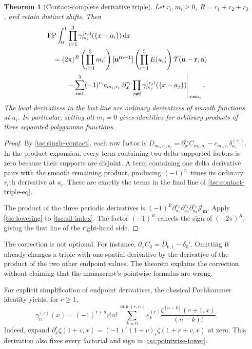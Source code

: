 \documentclass[11pt]{article}
\numberwithin{equation}{section}
\newtheorem{theorem}{Theorem}[section]
\theoremstyle{definition}\newtheorem{definition}[theorem]{Definition}
\theoremstyle{remark}\newtheorem{remark}[theorem]{Remark}
\DeclareMathOperator{\FP}{FP}
\newcommand{\dd}{\,\mathrm d}
\newcommand{\calJ}{\mathcal J}
\newcommand{\calT}{\mathcal T}
\begin{document}
\begin{theorem}[Contact-complete derivative triple]\label{tsc:contact-triple}
Let $r_i,m_i\ge0$, $R=r_1+r_2+r_3$, and retain distinct shifts. Then
\begin{align}\label{tsc:contact-triple-eq}
 &\FP\int_0^1\prod_{i=1}^3
            \gamma_{m_i}^{(r_i)}(\{x-a_i\})\dd x\notag\\
 &\quad=(2\pi)^R\left(\prod_{i=1}^3m_i!\right)
    [\mathbf u^{\mathbf m+\mathbf1}]
        \left(\prod_{i=1}^3E(u_i)\right)
                       \calT(\mathbf u-\mathbf r;\mathbf a)\notag\\
 &\qquad\quad-
    \sum_{i=1}^3(-1)^{r_i}c_{m_i,r_i}
       \left.\partial_x^{r_i}
              \prod_{j\ne i}\gamma_{m_j}^{(r_j)}(\{x-a_j\})
       \right|_{x=a_i}.
\end{align}
The local derivatives in the last line are ordinary derivatives of smooth
functions at $a_i$. In particular, setting all $m_i=0$ gives identities for
arbitrary products of three separated polygamma functions.
\end{theorem}
\begin{proof}
By \eqref{tsc:single-contact}, each raw factor is
$D_{m_i,r_i,a_i}=\partial_x^{r_i}C_{m_i,a_i}
                 -c_{m_i,r_i}\delta_{a_i}^{(r_i)}$.
In the product expansion, every term containing two delta-supported
factors is zero because their supports are disjoint. A term containing
one delta derivative pairs with the smooth remaining product, producing
$(-1)^{r_i}$ times its ordinary $r_i$th derivative at $a_i$. These are
exactly the terms in the final line of \eqref{tsc:contact-triple-eq}.

The product of the three periodic derivatives is
$(-1)^R\partial_{a_1}^{r_1}\partial_{a_2}^{r_2}\partial_{a_3}^{r_3}
\calJ_{\mathbf m}$. Apply \eqref{tsc:lowering} to
\eqref{tsc:all-index}. The factor $(-1)^R$ cancels the sign of
$(-2\pi)^R$, giving the first line of the right-hand side.
\end{proof}

The correction is not optional. For instance,
$\partial_x C_0=D_{0,1}-\delta_0'$. Omitting it already changes a triple
with one spatial derivative by the derivative of the product of the two
other endpoint values. The theorem explains the correction without
claiming that the manuscript's pointwise formulas are wrong.

For explicit simplification of endpoint derivatives, the classical
Pochhammer identity yields, for $r\ge1$,
\begin{equation}\label{tsc:pointwise-tower}
 \gamma_n^{(r)}(x)=(-1)^{r+n}r!n!
      \sum_{k=0}^{\min(r,n)}
       e_k^{(r)}\frac{\zeta^{[n-k]}(r+1,x)}{(n-k)!}.
\end{equation}
Indeed, expand
$\partial_x^r\zeta(1+v,x)=(-1)^r(1+v)_r\zeta(1+r+v,x)$ at zero.
This derivation also fixes every factorial and sign in
\eqref{tsc:pointwise-tower}.
\end{document}
